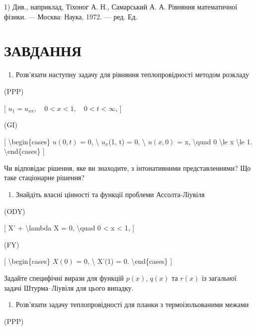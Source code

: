 \documentclass[
]{article}
\providecommand{\tightlist}{%
  \setlength{\itemsep}{0pt}\setlength{\parskip}{0pt}}
\begin{document}
{{1) Див., наприклад, Тіхоног А. Н., Самарський А. А. Рівняння
математичної фізики. --- Москва: Наука, 1972. --- ред. Ед.

\section{ЗАВДАННЯ}\label{ux437ux430ux432ux434ux430ux43dux43dux44f-4}

\begin{enumerate}
\def\labelenumi{\arabic{enumi}.}
\tightlist
\item
  Розв'язати наступну задачу для рівняння теплопровідності методом
  розкладу
\end{enumerate}

(PPP)

{[} \(u_1 = u_{xx}, \quad 0 < x < 1, \quad 0 < t < \infty\), {]}

(GI)

{[} \textbackslash begin\{cases\} \(u(0, t)\) = 0, \textbackslash{}
\(u_x\)(1, t) = 0, \textbackslash{} \(u(x, 0)\) = x, \textbackslash quad
0 \textbackslash le x \textbackslash le 1. \textbackslash end\{cases\}
{]}

Чи відповідає рішення, яке ви знаходите, з інтонативними
представленнями? Що таке стаціонарне рішення?

\begin{enumerate}
\def\labelenumi{\arabic{enumi}.}
\setcounter{enumi}{1}
\tightlist
\item
  Знайдіть власні цінності та функції проблеми Ассолта-Ліувіля
\end{enumerate}

(ODY)

{[} X' + \textbackslash lambda X = 0, \textbackslash quad 0 \textless{}
x \textless{} 1, {]}

(FY)

{[} \textbackslash begin\{cases\} \(X(0)\) = 0, \textbackslash{} X'(1) =
0. \textbackslash end\{cases\} {]}

Задайте специфічні вирази для функцій \(p(x)\), \(q(x)\) та \(r(x)\) із
загальної задачі Штурма--Ліувіля для цього випадку.

\begin{enumerate}
\def\labelenumi{\arabic{enumi}.}
\setcounter{enumi}{2}
\tightlist
\item
  Розв'язати задачу теплопровідності для планки з термоізольованими
  межами
\end{enumerate}

(PPP)

}}
\end{document}
